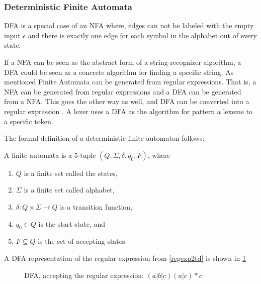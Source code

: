 \subsubsection{Deterministic Finite Automata}
DFA is a special case of an NFA where, edges can not be labeled with the empty
input $\epsilon$ and there is exactly one edge for each symbol in the alphabet
out of every state.

If a NFA can be seen as the abstract form of a string-recognizer algorithm, a
DFA could be seen as a concrete algorithm for finding a specific string. As
mentioned Finite Automata can be generated from regular expressions. That is, a
NFA can be generated from regular expressions and a DFA can be generated from a
NFA. This goes the other way as well, and DFA can be converted into a regular
expression \cite{Aho2006}. A lexer uses a DFA as the algorithm for pattern a
lexeme to a specific token.

The formal definition of a deterministic finite automaton follows:
\newline
\begin{definition} \label{finiteAutomataDef}
A finite automata is a 5-tuple $(Q, \Sigma, \delta, q_0, F)$, where
\begin{enumerate}
  \item $Q$ is a finite set called the states,
  \item $\Sigma$ is a finite set called alphabet,
  \item $\delta: Q \times \Sigma \to Q$ is a transition function,
  \item $q_0 \in Q$ is the start state, and
  \item $F \subseteq Q$ is the set of accepting states.
\end{enumerate} 
\end{definition}
\hfill 
\break
\begin{example} \label{regexp2dfa}
A DFA representation of the regular expression from \cref{regexp2td} is shown in \cref{fig:dfa}
\end{example}
\begin{figure}[!h]
  \centering
  \caption{DFA, accepting the regular expression: $(a|b|c)(a|c)* c$
  \label{fig:dfa}}
\end{figure}
